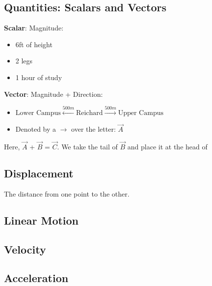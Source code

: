 \documentclass[../Notes.tex]{subfiles}
\begin{document}
    \subsection*{Quantities: Scalars and Vectors}

    \textbf{Scalar}: Magnitude:

    \begin{itemize}
        \item 6ft of height
        \item 2 legs
        \item 1 hour of study
    \end{itemize}

    \textbf{Vector}: Magnitude + Direction:
    
    \begin{itemize}
        \item $\boxed{\text{Lower Campus}} \xleftarrow{500m} \boxed{\text{Reichard}} \xrightarrow{500m} \boxed{\text{Upper Campus}}$
        \item Denoted by a $\rightarrow$ over the letter: $\stackrel{\rightarrow}{A}$
    \end{itemize}

        
    Here, $\stackrel{\rightarrow}{A}$ + $\stackrel{\rightarrow}{B}$ = $\stackrel{\rightarrow}{C}$. We take the tail of $\stackrel{\rightarrow}{B}$ and place it at the head of 
 
    \subsection*{Displacement}

    The distance from one point to the other.

    \subsection*{Linear Motion}

    \subsection*{Velocity}

    \subsection*{Acceleration}

    
\end{document}
